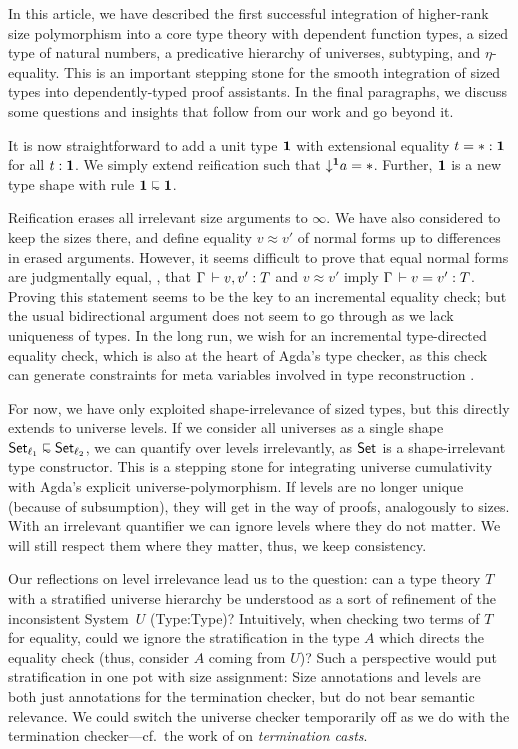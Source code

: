 \documentclass[acmlarge,review,anonymous]{acmart}\settopmatter{printfolios=true}
\begin{document}
In this article, we have described the first successful integration of higher-rank size polymorphism into a core type theory with dependent function types, a sized type of natural numbers, a predicative hierarchy of universes, subtyping, and $\eta$-equality.  This is an important stepping stone for the smooth integration of sized types into dependently-typed proof assistants.
In the final paragraphs, we discuss some questions and insights that follow from our work and go beyond it.

It is now straightforward to add a unit type $\mathbf{1}$ with extensional equality $t = {*} : \mathbf{1}$ for all $t : \mathbf{1}$.  We simply extend reification such that $\mathord{\downarrow^{\mathbf{1}}} a = {*}$.  Further, $\mathbf{1}$ is a new type shape with rule $\One \shape \One$.

Reification erases all irrelevant size arguments to $\infty$.  We have also considered to keep the sizes there, and define equality $v \approx v'$ of normal forms up to differences in erased arguments.  However, it seems difficult to prove that equal normal forms are judgmentally equal, \ie, that $\Gamma \,\vdash v,v' : T$ and $v \approx v'$ imply $\Gamma \,\vdash v = v' : T$.  Proving this statement seems to be the key to an incremental equality check; but
the usual bidirectional argument \cite{abelScherer:types10} does not seem to go through as we lack uniqueness of types.
In the long run, we wish for an incremental type-directed equality check, which is also at the heart of Agda's type checker, as this check can generate constraints for meta variables involved in type reconstruction \cite{norell:PhD}.

For now, we have only exploited shape-irrelevance of sized types, but this directly extends to universe levels.  If we consider all universes as a single shape $\Set[\ell_1] \shape \Set[\ell_2]$, we can quantify over levels irrelevantly, as $\mathsf{Set}_{}$ is a shape-irrelevant type constructor.  This is a stepping stone for integrating universe cumulativity with Agda's explicit universe-polymorphism.  If levels are no longer unique (because of subsumption), they will get in the way of proofs, analogously to sizes.  With an irrelevant quantifier we can ignore levels where they do not matter.  We will still respect them where they matter, thus, we keep consistency.

Our reflections on level irrelevance lead us to the question: can a type theory $T$ with a stratified universe hierarchy be understood as a sort of refinement of the inconsistent System~$U$ (Type:Type)?  Intuitively, when checking two terms of $T$ for equality, could we ignore the stratification in the type $A$ which directs the equality check (thus, consider $A$ coming from $U$)?
Such a perspective would put stratification in one pot with size assignment:  Size annotations and levels are both just annotations for the termination checker, but do not bear semantic relevance.  We could switch the universe checker temporarily off as we do with the termination checker---cf.\ the work of \citet{stumpSjobergWeirich:par10} on \emph{termination casts}.
\end{document}
